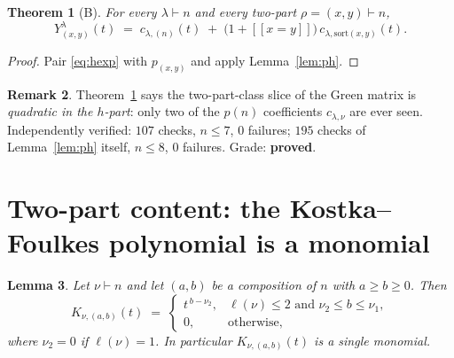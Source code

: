 \documentclass[11pt]{article}
\theoremstyle{plain}
\newtheorem{theorem}{Theorem}
\newtheorem{lemma}[theorem]{Lemma}
\theoremstyle{definition}
\newtheorem{remark}[theorem]{Remark}
\newcommand{\lam}{\lambda}
\newcommand{\lb}{[\![}
\newcommand{\rb}{]\!]}
\begin{document}
\begin{theorem}[B]\label{thm:B}
For every $\lam\vdash n$ and every two-part $\rho=(x,y)\vdash n$,
\[
  Y^{\lam}_{(x,y)}(t)\;=\;c_{\lam,(n)}(t)\;+\;\bigl(1+\lb x=y\rb\bigr)\,c_{\lam,\mathrm{sort}(x,y)}(t).
\]
\end{theorem}

\begin{proof}
Pair \eqref{eq:hexp} with $p_{(x,y)}$ and apply Lemma~\ref{lem:ph}.
\end{proof}

\begin{remark}
Theorem~\ref{thm:B} says the two-part-class slice of the Green matrix is \emph{quadratic in the
$h$-part}: only two of the $p(n)$ coefficients $c_{\lam,\nu}$ are ever seen. Independently
verified: $107$ checks, $n\le 7$, $0$ failures; $195$ checks of Lemma~\ref{lem:ph} itself,
$n\le 8$, $0$ failures. Grade: \textbf{proved}.
\end{remark}

\section{Two-part content: the Kostka--Foulkes polynomial is a monomial}

\begin{lemma}\label{lem:mono}
Let $\nu\vdash n$ and let $(a,b)$ be a composition of $n$ with $a\ge b\ge 0$. Then
\[
  K_{\nu,(a,b)}(t)\;=\;
  \begin{cases}
    t^{\,b-\nu_2}, & \ell(\nu)\le 2 \text{ and } \nu_2\le b\le \nu_1,\\[2pt]
    0,&\text{otherwise,}
  \end{cases}
\]
where $\nu_2=0$ if $\ell(\nu)=1$. In particular $K_{\nu,(a,b)}(t)$ is a single monomial.
\end{lemma}
\end{document}
